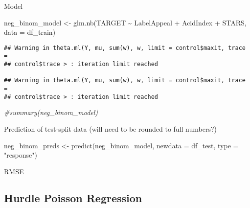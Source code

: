 \documentclass[
]{article}
\newenvironment{Shaded}{\begin{snugshade}}{\end{snugshade}}
\newcommand{\AttributeTok}[1]{\textcolor[rgb]{0.77,0.63,0.00}{#1}}
\newcommand{\CommentTok}[1]{\textcolor[rgb]{0.56,0.35,0.01}{\textit{#1}}}
\newcommand{\DecValTok}[1]{\textcolor[rgb]{0.00,0.00,0.81}{#1}}
\newcommand{\FunctionTok}[1]{\textcolor[rgb]{0.00,0.00,0.00}{#1}}
\newcommand{\NormalTok}[1]{#1}
\newcommand{\OtherTok}[1]{\textcolor[rgb]{0.56,0.35,0.01}{#1}}
\newcommand{\SpecialCharTok}[1]{\textcolor[rgb]{0.00,0.00,0.00}{#1}}
\newcommand{\StringTok}[1]{\textcolor[rgb]{0.31,0.60,0.02}{#1}}
\begin{document}
Model

\begin{Shaded}
\begin{Highlighting}[]
\NormalTok{neg\_binom\_model }\OtherTok{\textless{}{-}} \FunctionTok{glm.nb}\NormalTok{(TARGET }\SpecialCharTok{\textasciitilde{}}\NormalTok{ LabelAppeal }\SpecialCharTok{+}\NormalTok{ AcidIndex }\SpecialCharTok{+}\NormalTok{ STARS, }\AttributeTok{data =}\NormalTok{ df\_train)}
\end{Highlighting}
\end{Shaded}

\begin{verbatim}
## Warning in theta.ml(Y, mu, sum(w), w, limit = control$maxit, trace =
## control$trace > : iteration limit reached

## Warning in theta.ml(Y, mu, sum(w), w, limit = control$maxit, trace =
## control$trace > : iteration limit reached
\end{verbatim}

\begin{Shaded}
\begin{Highlighting}[]
\CommentTok{\#summary(neg\_binom\_model)}
\end{Highlighting}
\end{Shaded}

Prediction of test-split data (will need to be rounded to full numbers?)

\begin{Shaded}
\begin{Highlighting}[]
\NormalTok{neg\_binom\_preds }\OtherTok{\textless{}{-}} \FunctionTok{predict}\NormalTok{(neg\_binom\_model, }\AttributeTok{newdata =}\NormalTok{ df\_test, }\AttributeTok{type =} \StringTok{"response"}\NormalTok{)}
\end{Highlighting}
\end{Shaded}

RMSE

\begin{Shaded}
\end{Shaded}

\hypertarget{hurdle-poisson-regression}{%
\subsection{Hurdle Poisson Regression}\label{hurdle-poisson-regression}}
\end{document}

